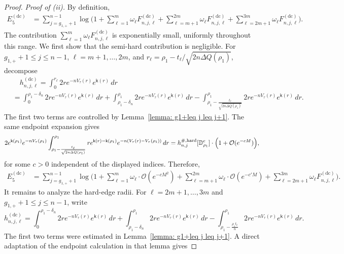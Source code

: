 \documentclass[a4paper]{article}
\numberwithin{equation}{section}
\begin{document}
\begin{proof}
\medskip

\emph{Proof of (ii).}
By definition,
\begin{align*}
E_5^{(\mathrm{dc})}&=  
\sum_{j=g_{1,+}+1}^{n-1}\log\Big(
1+\sum_{\ell=1}^{m}\omega_{\ell}F_{n,j,\ell}^{(\mathrm{dc})}
+\sum_{\ell=m+1}^{2m}\omega_{\ell}F_{n,j,\ell}^{(\mathrm{dc})}
+\sum_{\ell=2m+1}^{3m}\omega_{\ell}F_{n,j,\ell}^{(\mathrm{dc})}
\Bigr).
\end{align*}
The contribution
$\sum_{\ell=1}^{m}\omega_{\ell}F_{n,j,\ell}^{(\mathrm{dc})}$ is
exponentially small, uniformly throughout this range.
We first show that the semi-hard contribution is negligible.  For
$g_{1,+}+1\leq j\leq n-1$, $\ell=m+1,\ldots,2m$, and
$r_{\ell}=\rho_1-t_{\ell}/\sqrt{2n\Delta Q(\rho_1)}$, decompose
\begin{align*}
&\quad h_{n,j,\ell}^{(\mathrm{dc})}
=\int_0^{r_{\ell}}2r e^{-nV_{\tau}(r)}e^{\mathsf{k}(r)}\,dr
\\
&=\int_0^{\rho_1-\delta_n}2r e^{-nV_{\tau}(r)}e^{\mathsf{k}(r)}\,dr
+\int_{\rho_1-\delta_n}^{\rho_1}2r e^{-nV_{\tau}(r)}e^{\mathsf{k}(r)}\,dr
-\int_{\rho_1-\frac{t_{\ell}}{\sqrt{2n\Delta Q(\rho_1)}}}^{\rho_1}2r e^{-nV_{\tau}(r)}e^{\mathsf{k}(r)}\,dr.
\end{align*}
The first two terms are controlled by
Lemma~\ref{lemma: g1+leq j leq j+1}.  The same endpoint expansion gives
\[
2e^{\mathsf{k}(\rho_1)}e^{-nV_{\tau}(\rho_1)}\int_{\rho_1-\frac{t_{\ell}}{\sqrt{2n\Delta Q(\rho_1)}}}^{\rho_1}re^{\mathsf{k}(r)-\mathsf{k}(\rho_1)}e^{-n(V_{\tau}(r)-V_{\tau}(\rho_1))}\,dr
=h_{n,j}^{\#,\mathrm{hard}}[\mathbb{D}_{\rho_1}^{\rm c}]\cdot\Bigl(1+\mathcal{O}(e^{-cM})\Bigr),
\]
for some $c>0$ independent of the displayed indices.  Therefore,
\begin{align*}
E_5^{(\mathrm{dc})}&=  
\sum_{j=g_{1,+}+1}^{n-1}\log\Big(
1+\sum_{\ell=1}^{m}\omega_{\ell}\cdot \mathcal{O}(e^{-cM^2})
+\sum_{\ell=m+1}^{2m}\omega_{\ell}\cdot \mathcal{O}(e^{-c'M})
+\sum_{\ell=2m+1}^{3m}\omega_{\ell}F_{n,j,\ell}^{(\mathrm{dc})}
\Bigr). 
\end{align*}
It remains to analyze the hard-edge radii.  For
$\ell=2m+1,\ldots,3m$ and $g_{1,+}+1\leq j\leq n-1$, write
\[
h_{n,j,\ell}^{(\mathrm{dc})}
=\int_0^{\rho_1-\delta_n}2r e^{-nV_{\tau}(r)}e^{\mathsf{k}(r)}\,dr
+\int_{\rho_1-\delta_n}^{\rho_1}2r e^{-nV_{\tau}(r)}e^{\mathsf{k}(r)}\,dr
-\int_{\rho_1-\frac{\rho_1t_{\ell}}{n}}^{\rho_1}2r e^{-nV_{\tau}(r)}e^{\mathsf{k}(r)}\,dr.
\]
The first two terms were estimated in
Lemma~\ref{lemma: g1+leq j leq j+1}.  A direct adaptation of the endpoint
calculation in that lemma gives

\end{proof}
\end{document}
